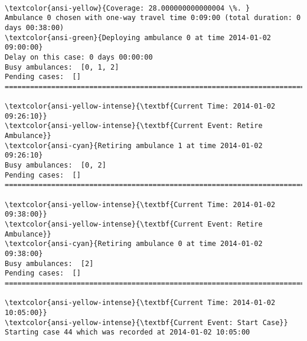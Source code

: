 \documentclass[11pt]{article}
\begin{document}
    \begin{center}
    \end{center}
    { \hspace*{\fill} \\}
    
    \begin{Verbatim}[commandchars=\\\{\}]
\textcolor{ansi-yellow}{Coverage: 28.000000000000004 \%. }
Ambulance 0 chosen with one-way travel time 0:09:00 (total duration: 0 days 00:38:00)
\textcolor{ansi-green}{Deploying ambulance 0 at time 2014-01-02 09:00:00}
Delay on this case: 0 days 00:00:00
Busy ambulances:  [0, 1, 2]
Pending cases:  []
========================================================================

\textcolor{ansi-yellow-intense}{\textbf{Current Time: 2014-01-02 09:26:10}}
\textcolor{ansi-yellow-intense}{\textbf{Current Event: Retire Ambulance}}
\textcolor{ansi-cyan}{Retiring ambulance 1 at time 2014-01-02 09:26:10}
Busy ambulances:  [0, 2]
Pending cases:  []
========================================================================

\textcolor{ansi-yellow-intense}{\textbf{Current Time: 2014-01-02 09:38:00}}
\textcolor{ansi-yellow-intense}{\textbf{Current Event: Retire Ambulance}}
\textcolor{ansi-cyan}{Retiring ambulance 0 at time 2014-01-02 09:38:00}
Busy ambulances:  [2]
Pending cases:  []
========================================================================

\textcolor{ansi-yellow-intense}{\textbf{Current Time: 2014-01-02 10:05:00}}
\textcolor{ansi-yellow-intense}{\textbf{Current Event: Start Case}}
Starting case 44 which was recorded at 2014-01-02 10:05:00

    \end{Verbatim}

    \begin{center}
    \end{center}
    { \hspace*{\fill} \\}
    
\end{document}
